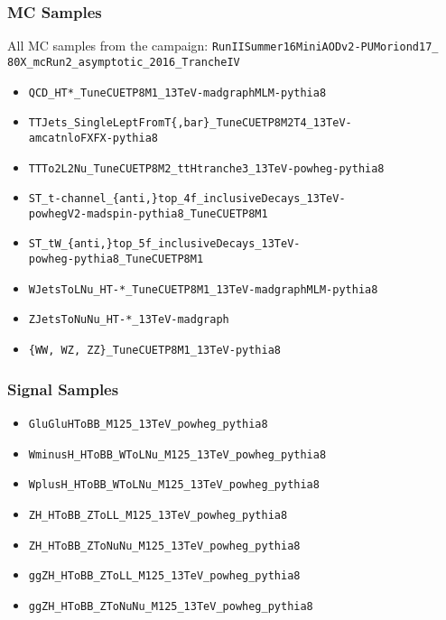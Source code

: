 \documentclass{beamer}
\begin{document}
\begin{frame}
  \frametitle{MC Samples}
  All MC samples from the campaign: \texttt{RunIISummer16MiniAODv2-PUMoriond17\_ \\
    80X\_mcRun2\_asymptotic\_2016\_TrancheIV}

  \vspace{12pt}

  {\footnotesize
    \begin{itemize}
    \item \texttt{QCD\_HT*\_TuneCUETP8M1\_13TeV-madgraphMLM-pythia8}
    \item \texttt{TTJets\_SingleLeptFromT\{,bar\}\_TuneCUETP8M2T4\_13TeV- \\
      amcatnloFXFX-pythia8}
    \item \texttt{TTTo2L2Nu\_TuneCUETP8M2\_ttHtranche3\_13TeV-powheg-pythia8}
    \item \texttt{ST\_t-channel\_\{anti,\}top\_4f\_inclusiveDecays\_13TeV- \\
      powhegV2-madspin-pythia8\_TuneCUETP8M1}
    \item \texttt{ST\_tW\_\{anti,\}top\_5f\_inclusiveDecays\_13TeV- \\
      powheg-pythia8\_TuneCUETP8M1}
    \item \texttt{WJetsToLNu\_HT-*\_TuneCUETP8M1\_13TeV-madgraphMLM-pythia8}
    \item \texttt{ZJetsToNuNu\_HT-*\_13TeV-madgraph}
    \item \texttt{\{WW, WZ, ZZ\}\_TuneCUETP8M1\_13TeV-pythia8}
    \end{itemize}
  }
\end{frame}

\begin{frame}
  \frametitle{Signal Samples}

  {
    \begin{itemize}
    \item \texttt{GluGluHToBB\_M125\_13TeV\_powheg\_pythia8}
    \item \texttt{WminusH\_HToBB\_WToLNu\_M125\_13TeV\_powheg\_pythia8}
    \item \texttt{WplusH\_HToBB\_WToLNu\_M125\_13TeV\_powheg\_pythia8}
    \item \texttt{ZH\_HToBB\_ZToLL\_M125\_13TeV\_powheg\_pythia8}
    \item \texttt{ZH\_HToBB\_ZToNuNu\_M125\_13TeV\_powheg\_pythia8}
    \item \texttt{ggZH\_HToBB\_ZToLL\_M125\_13TeV\_powheg\_pythia8}
    \item \texttt{ggZH\_HToBB\_ZToNuNu\_M125\_13TeV\_powheg\_pythia8}
    \end{itemize}
  }
\end{frame}
\end{document}
